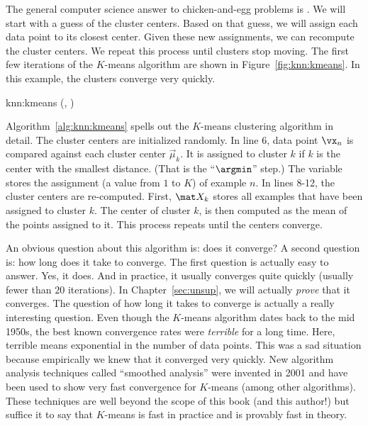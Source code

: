 The general computer science answer to chicken-and-egg problems is
.  We will start with a guess of the cluster
centers.  Based on that guess, we will assign each data point to its
closest center.  Given these new assignments, we can recompute the
cluster centers.  We repeat this process until clusters stop moving.
The first few iterations of the $K$-means algorithm are shown in
Figure~\ref{fig:knn:kmeans}.  In this example, the clusters converge
very quickly.

\newalgorithm%
  {knn:kmeans}%
  {(, )}
  {
 
\ENDFOR
\REPEAT
{}
\ENDFOR
{}
\ENDFOR
{}
\RETURN {} 
}

Algorithm~\ref{alg:knn:kmeans} spells out the $K$-means clustering
algorithm in detail.  The cluster centers are initialized randomly.
In line 6, data point $\vx_n$ is compared against each cluster center
$\vec\mu_k$.  It is assigned to cluster $k$ if $k$ is the center with
the smallest distance.  (That is the ``$\argmin$'' step.)  The
variable  stores the assignment (a value from $1$ to $K$)
of example $n$.  In lines 8-12, the cluster centers are re-computed.
First, $\mat X_k$ stores all examples that have been assigned to
cluster $k$.  The center of cluster $k$,  is then
computed as the mean of the points assigned to it.  This process
repeats until the centers converge.

An obvious question about this algorithm is: does it converge?  A
second question is: how long does it take to converge.  The first
question is actually easy to answer.  Yes, it does.  And in practice,
it usually converges quite quickly (usually fewer than $20$
iterations).  In Chapter~\ref{sec:unsup}, we will actually
\emph{prove} that it converges.  The question of how long it takes to
converge is actually a really interesting question.  Even though the
$K$-means algorithm dates back to the mid 1950s, the best known
convergence rates were \emph{terrible} for a long time.  Here,
terrible means exponential in the number of data points.  This was a
sad situation because empirically we knew that it converged very
quickly.  New algorithm analysis techniques called ``smoothed
analysis'' were invented in 2001 and have been used to show very fast
convergence for $K$-means (among other algorithms).  These techniques
are well beyond the scope of this book (and this author!) but suffice
it to say that $K$-means is fast in practice and is provably fast in
theory.


